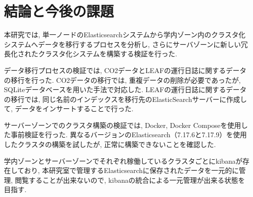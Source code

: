 \chapter{結論と今後の課題}
\label{chap:fifth}
本研究では, 単一ノードのElasticsearchシステムから学内ゾーン内のクラスタ化システムへデータを移行するプロセスを分析し, さらにサーバゾーンに新しい冗長化されたクラスタ化システムを構築する検証を行った. 

データ移行プロセスの検証では, CO2データとLEAFの運行日誌に関するデータの移行を行った. CO2データの移行では, 重複データの削除が必要であったが, SQLiteデータベースを用いた手法で対応した. LEAFの運行日誌に関するデータの移行では, 同じ名前のインデックスを移行先のElasticSearchサーバーに作成して, データをインサートすることで行った. 

サーバーゾーンでのクラスタ構築の検証では, Docker, Docker Composeを使用した事前検証を行った. 異なるバージョンのElasticsearch（7.17.6と7.17.9）を使用したクラスタの構築を試したが, 正常に構築できないことを確認した. 

学内ゾーンとサーバーゾーンでそれぞれ稼働しているクラスタごとにkibanaが存在しており, 本研究室で管理するElasticsearchに保存されたデータを一元的に管理, 閲覧することが出来ないので, kibanaの統合による一元管理が出来る状態を目指す.

